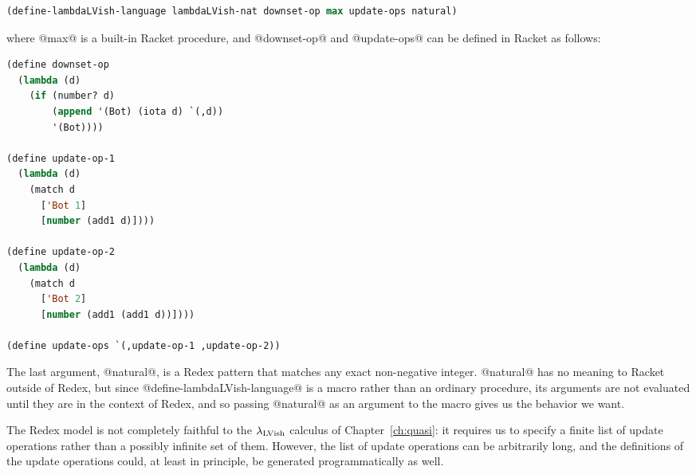\singlespacing
\begin{lstlisting}[language=Lisp]
(define-lambdaLVish-language lambdaLVish-nat downset-op max update-ops natural)
\end{lstlisting}
\doublespacing

\noindent where @max@ is a built-in Racket procedure, and @downset-op@
and @update-ops@ can be defined in Racket as follows:

\singlespacing
\begin{lstlisting}[language=Lisp]
(define downset-op
  (lambda (d)
    (if (number? d)
        (append '(Bot) (iota d) `(,d))
        '(Bot))))

(define update-op-1
  (lambda (d)
    (match d
      ['Bot 1]
      [number (add1 d)])))

(define update-op-2
  (lambda (d)
    (match d
      ['Bot 2]
      [number (add1 (add1 d))])))

(define update-ops `(,update-op-1 ,update-op-2))
\end{lstlisting}
\doublespacing

\noindent The last argument, @natural@, is a Redex pattern that
matches any exact non-negative integer.  @natural@ has no meaning to
Racket outside of Redex, but since @define-lambdaLVish-language@ is a
macro rather than an ordinary procedure, its arguments are not
evaluated until they are in the context of Redex, and so passing
@natural@ as an argument to the macro gives us the behavior we want.

The Redex model is not completely faithful to the $\lambda_{\textrm{LVish}}$
calculus of Chapter~\ref{ch:quasi}: it requires us to specify a finite
list of update operations rather than a possibly infinite set of them.
However, the list of update operations can be arbitrarily long, and
the definitions of the update operations could, at least in principle,
be generated programmatically as well.
